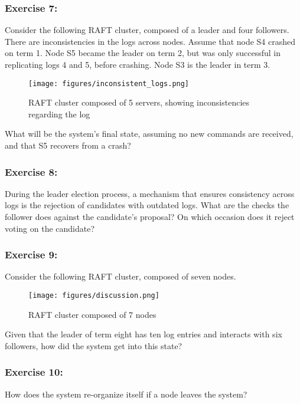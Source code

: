 \documentclass[12pt,a4paper]{article}
\begin{document}
\subsubsection*{Exercise 7:} Consider the following RAFT cluster, composed of a leader and four followers. There are inconsistencies in the logs across nodes. Assume that node S4 crashed on term 1. Node S5 became the leader on term 2, but was only successful in replicating logs 4 and 5, before crashing. Node S3 is the leader in term 3.

\begin{figure}[H]
    \centering
    \texttt{[image: figures/inconsistent\_logs.png]}
    \caption{RAFT cluster composed of 5 servers, showing inconsistencies regarding the log}
    \label{fig:inconsistent_logs}
\end{figure}

What will be the system's final state, assuming no new commands are received, and that S5 recovers from a crash?


\subsubsection*{Exercise 8:} During the leader election process, a mechanism that ensures consistency across logs is the rejection of candidates with outdated logs. What are the checks the follower does against the candidate's proposal? On which occasion does it reject voting on the candidate?


\subsubsection*{Exercise 9:} Consider the following RAFT cluster, composed of seven nodes.

\begin{figure}[H]
    \centering
    \texttt{[image: figures/discussion.png]}
    \caption{RAFT cluster composed of 7 nodes}
    \label{fig:inconsistent_logs}
\end{figure}

Given that the leader of term eight has ten log entries and interacts with six followers, how did the system get into this state?

\subsubsection*{Exercise 10:} How does the system re-organize itself if a node leaves the system?




\end{document}
